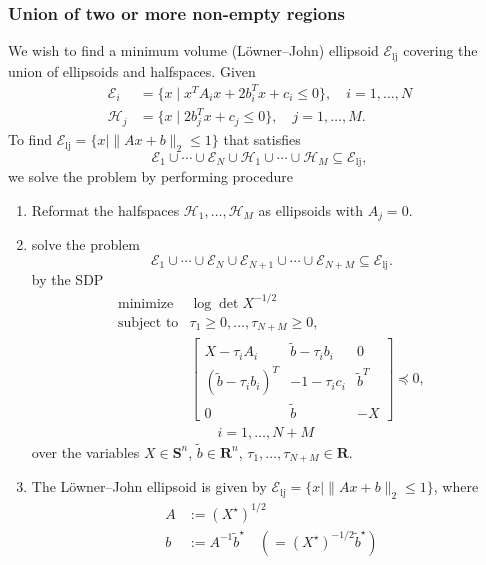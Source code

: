 \documentclass[letterpaper, 10pt, conference]{ieeeconf}   %
\begin{document}
\subsubsection{Union of two or more non-empty regions}
We wish to find a minimum volume (L\"owner--John) ellipsoid
$\mathcal{E}_\mathrm{lj}$ covering the union of ellipsoids and halfspaces. Given
\begin{align*}
	\mathcal{E}_i &= \{ x \mid x^T A_i x + 2 b_i^Tx + c_i \leq 0 \}, \quad i=1,\ldots,N\\
	\mathcal{H}_j &= \{ x \mid 2b_j^Tx + c_j \leq 0 \}, \quad j=1,\ldots,M.
\end{align*}
To find $\mathcal{E}_\mathrm{lj} = \{ x \mid \|Ax + b\|_2 \leq 1 \}$ that satisfies
\[
	\mathcal{E}_1 \cup \cdots \cup \mathcal{E}_N
	\cup
	\mathcal{H}_1 \cup \cdots \cup \mathcal{H}_M
	\subseteq
	\mathcal{E}_\mathrm{lj},
\]
we solve the problem by performing procedure
\begin{enumerate}
	\item Reformat the halfspaces $\mathcal{H}_1,\ldots,\mathcal{H}_M$ as
		ellipsoids with $A_j = 0$.
	\item solve the problem
	\[
		\mathcal{E}_1 \cup \cdots \cup \mathcal{E}_N
		\cup
		\mathcal{E}_{N+1} \cup \cdots \cup \mathcal{E}_{N+M}
		\subseteq
		\mathcal{E}_\mathrm{lj}.
	\]
	by the SDP~\cite[\S{}8.4.1]{Boyd:2004}
	\[
		\begin{array}{ll}
			\mbox{minimize}   & \log \det X^{-1/2} \\
			\mbox{subject to} 
				& \tau_1 \geq 0, \ldots, \tau_{N+M} \geq 0,\\
				& \begin{bmatrix}
					X - \tau_i A_i & \tilde{b} - \tau_i b_i & 0\\
					(\tilde{b} - \tau_i b_i)^T & -1 - \tau_i c_i & {\tilde{b}}^T \\
					0 & {\tilde{b}} & -X
				\end{bmatrix}
				\preceq 0, \\
				& \qquad i=1,\ldots,N+M
		\end{array}
	\]
	over the variables $X \in \mathbf{S}^n$, $\tilde{b} \in \mathbf{R}^n$,
	$\tau_1,\ldots,\tau_{N+M} \in \mathbf{R}$.
	\item The L\"owner--John ellipsoid is given by 
		$\mathcal{E}_\mathrm{lj} = \{ x \mid \|Ax + b\|_2 \leq 1 \}$, where
		\begin{align*}
			A &:= (X^\star)^{1/2}\\
			b &:= A^{-1}{\tilde{b}}^\star \quad (= (X^\star)^{-1/2} {\tilde{b}}^\star)
		\end{align*}
\end{enumerate}
\end{document}
